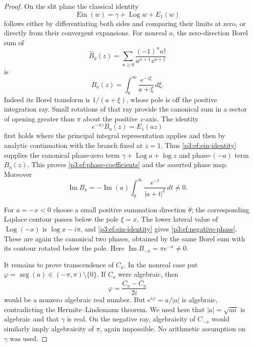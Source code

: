 \documentclass[11pt,a4paper]{article}
\theoremstyle{definition}
\theoremstyle{remark}
\numberwithin{equation}{section}
\begin{document}
\begin{proof}
On the slit plane the classical identity \cite[\S6.2]{p3:DLMF}
\begin{equation}\label{p3:ef:ein-identity}
 \operatorname{Ein}(w)=\gamma+\operatorname{Log}w+E_1(w)
\end{equation}
follows either by differentiating both sides and comparing their
limits at zero, or directly from their convergent expansions.
For nonreal $a$, the zero-direction Borel sum of
\[
 \widehat B_a(z)=\sum_{n\ge0}
       \frac{(-1)^n n!}{a^{n+1}z^{n+1}}
\]
is
\[
 B_a(z)=\int_0^\infty\frac{e^{-z\xi}}{a+\xi}\,d\xi.
\]
Indeed its Borel transform is $1/(a+\xi)$, whose pole is off the
positive integration ray.  Small rotations of that ray provide the
canonical sum in a sector of opening greater than $\pi$ about the
positive $z$-axis.  The identity
\[
 e^{-az}B_a(z)=E_1(az)
\]
first holds where the principal integral representation applies and
then by analytic continuation with the branch fixed at $z=1$.
Thus \eqref{p3:ef:ein-identity} supplies the canonical phase-zero term
$\gamma+\operatorname{Log}a+\log z$ and phase-$(-a)$ term $B_a(z)$.
This proves \eqref{p3:ef:phase-coefficients} and the asserted phase map.
Moreover
\[
 \operatorname{Im}B_a
 =-\operatorname{Im}(a)
    \int_0^\infty\frac{e^{-t}}{|a+t|^2}\,dt\ne0.
\]

For $a=-x<0$ choose a small positive summation direction $\theta$;
the corresponding Laplace contour passes below the pole $\xi=x$.
The lower lateral value of $\operatorname{Log}(-x)$ is $\log x-i\pi$,
and \eqref{p3:ef:ein-identity} gives \eqref{p3:ef:negative-phase}.
These are again the canonical two phases, obtained by the same Borel
sum with its contour rotated below the pole.  Here
$\operatorname{Im}B_{-x}=\pi e^{-x}\ne0$.

It remains to prove transcendence of $C_a$.  In the nonreal case put
$\varphi=\arg(a)\in(-\pi,\pi)\setminus\{0\}$.  If $C_a$ were
algebraic, then
\[
 \varphi=\frac{C_a-\overline{C_a}}{2i}
\]
would be a nonzero algebraic real number.  But
$e^{i\varphi}=a/|a|$ is algebraic, contradicting the
Hermite--Lindemann theorem.  We used here that
$|a|=\sqrt{a\overline a}$ is algebraic and that $\gamma$ is real.
On the negative ray, algebraicity of $C_{-x}$ would similarly imply
algebraicity of $\pi$, again impossible.  No arithmetic assumption on
$\gamma$ was used.
\end{proof}
\end{document}
